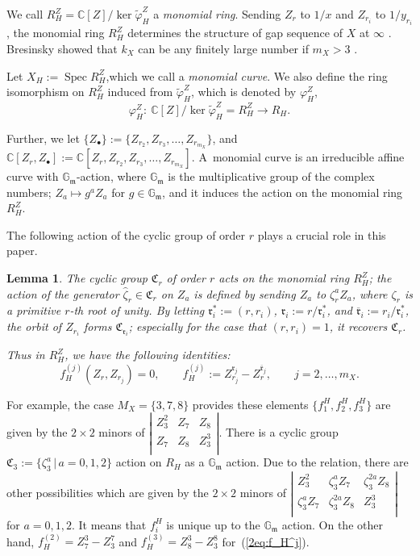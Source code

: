 \documentclass[pdftex]{sigma}
\def\CC{{\mathbb C}}
\def\GG{{\mathbb G}}
\def\fC{{\mathfrak C}}
\def\fm{{\mathfrak m}}
\def\fr{{\mathfrak r}}
\def\tvarphi{{\widetilde \varphi}}
\def\Bfr{{\overline{\mathfrak r}}}
\def\hzeta{{\widehat \zeta}}
\def\Spec{\operatorname{Spec}}
\numberwithin{equation}{section}
\newtheorem{Lemma}[Theorem]{Lemma}
\begin{document}
We call $R^Z_H=\CC[Z]/ \ker\tvarphi^Z_H$ a \emph{monomial ring}.
Sending $Z_r$ to $1/x$ and $Z_{r_i}$ to $1/y_{r_i}$, the monomial ring $R^Z_H$
determines the structure of gap sequence of $X$ at $\infty$ \cite{Herzog70, Pinkham74}.
Bresinsky showed that $k_X$ can be any finitely large number if $m_X>3$ \cite{Bresinsky}.

Let $X_H:=\Spec R_H^Z$,which we call a \emph{monomial curve}.
We also define the ring isomorphism on $R_H^Z$ induced from $\tvarphi^Z_H$, which is denoted by $\varphi^Z_H$,
\begin{equation*}
\varphi^Z_H\colon \ \CC[Z]/ \ker\tvarphi^Z_H=R^Z_H \to R_H.%
\end{equation*}

Further, we let $\{Z_{\bullet}\}:=\{Z_{r_2}, Z_{r_3}, \dots, Z_{r_{m_X}}\}$, and $\CC[Z_r, Z_{\bullet}]:=\CC[Z_r, Z_{r_2}, Z_{r_3}, \dots, Z_{r_{m_X}}]$.
A~monomial curve is an irreducible affine curve with $\GG_\fm$-action, where $\GG_\fm$ is the multiplicative group of the complex numbers; $Z_a \mapsto g^{a} Z_a$ for $g\in \GG_\fm$, and it induces the action on the monomial ring $R_H^Z$.

The following action of the cyclic group of order $r$ plays a crucial role in this paper.

\begin{Lemma} \label{2lm:fC_r_action}
The cyclic group $\fC_r$ of order $r$ acts on the monomial ring $R_H^Z$;
the action of the generator $\hzeta_r \in \fC_r$ on $Z_a$ is defined by sending $Z_a$ to $\zeta_r^{a}Z_a$, where $\zeta_r$ is a primitive $r$-th root of unity.
By letting $\fr_i^*:=(r, r_i)$, $\fr_i := r/\fr_i^*$, and $\Bfr_i:=r_i/\fr_i^*$, the orbit of $Z_{r_i}$ forms $\fC_{\fr_i}$; especially for the case that $(r, r_i) = 1$, it recovers $\fC_r$.

Thus in $R_H^Z$, we have the following identities:
\begin{equation}
f_H^{(j)}(Z_r, Z_{r_j})= 0, \qquad f_H^{(j)}:=Z_{r_j}^{\fr_j}-Z_r^{\Bfr_j},
\qquad j = 2, \dots, m_X.\label{2eq:f_H^j}
\end{equation}
\end{Lemma}

For example, the case $M_X=\{3,7,8\}$ provides these elements $\big\{f^H_1,f^H_2, f^H_3\big\}$ are given by the $2 \times 2$ minors of
$\left|\begin{smallmatrix}
 Z_3^2 & Z_7 & Z_8 \\
 Z_7 & Z_8 & Z_3^3\\
\end{smallmatrix} \right|$.
There is a cyclic group $\fC_3:=\{\zeta_3^a\, | \, a=0,1,2\}$ action on $R_H$ as a $\GG_\fm$ action. Due to the relation, there are other possibilities which are given by the $2 \times 2$ minors of
$
\left|\begin{smallmatrix}
 Z_3^2 & \zeta_3^a Z_7 & \zeta_3^{2a}Z_8 \\
\zeta_3^a Z_7 & \zeta_3^{2a}Z_8 & Z_3^3\\
\end{smallmatrix} \right|$ for $a=0,1,2$.
It means that $f^H_i$ is unique up to the $\GG_\fm$ action.
On the other hand, $f_H^{(2)}=Z_7^3-Z_3^7$ and $f_H^{(3)}=Z_8^3-Z_3^8$ for~(\ref{2eq:f_H^j}).
\end{document}
